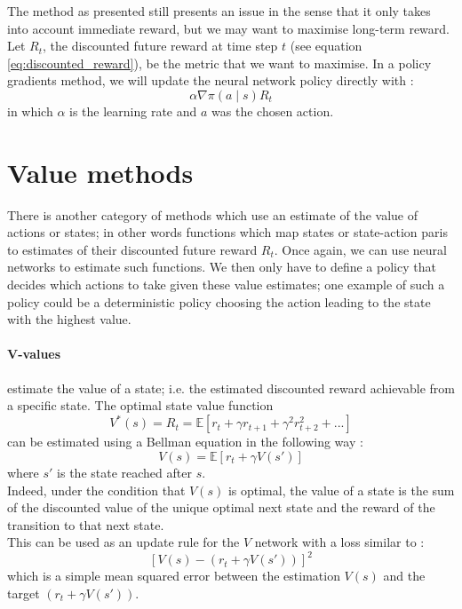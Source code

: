The method as presented still presents an issue in the sense that it only takes
into account immediate reward, but we may want to maximise long-term reward.
Let $R_t$, the discounted future reward at time step $t$ (see equation 
\ref{eq:discounted_reward}), be the metric
that we want to maximise. In a policy gradients method, we will update the
neural network policy directly with :
\begin{equation}
	\label{eq:policy_update_rule}
	\alpha \nabla \pi(a \mid s) R_t
\end{equation}
in which $\alpha$ is the learning rate and $a$ was the chosen action.

\section{Value methods}
There is another category of methods which use an estimate of the value of
actions or states; in other words functions which map states or state-action
paris to estimates of their discounted future reward $R_t$. Once again, we can
use neural networks to estimate such functions. We then only have to define
a policy that decides which actions to take given these value estimates; one
example of such a policy could be a deterministic policy choosing the action
leading to the state with the highest value.\\

\paragraph{V-values} estimate the value of a state; i.e. the estimated
discounted reward achievable from a specific state.
The optimal state value function 
$$ V^*(s) = R_t = \mathbb{E}
   \left[ r_t + \gamma r_{t+1} + \gamma^2 r_{t+2}^2 + ...  \right]$$
can be estimated using a Bellman equation in the following way :
$$ V(s) = \mathbb{E}\left[ r_t + \gamma V(s')\right]$$
where $s'$ is the state reached after $s$.\\

Indeed, under the condition that $V(s)$ is optimal, the value of a state is the 
sum of the discounted value of the unique optimal next state and the reward of
the transition to that next state.\\

This can be used as an update rule for the $V$ network with a loss similar to :
\begin{equation}
	\label{eq:v_update_rule}
\left[V(s) -  \left(r_t + \gamma V(s') \right)\right]^2 
\end{equation}
\noindent which is a simple mean squared error between the estimation $V(s)$ and
the target $\left(r_t + \gamma V(s') \right)$.

